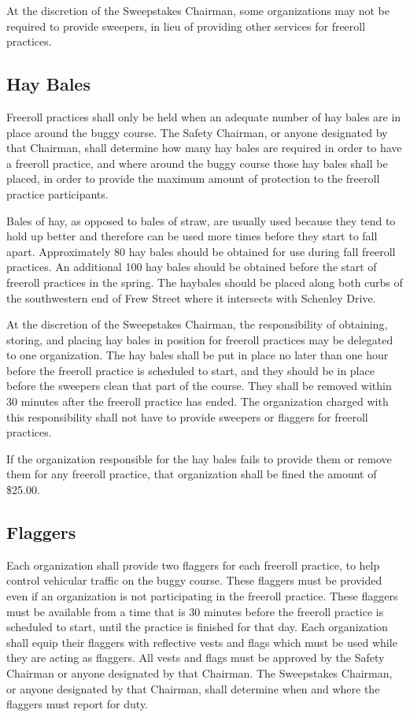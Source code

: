 At the discretion of the Sweepstakes Chairman, some organizations may not be required to provide sweepers, in lieu of providing other services for freeroll practices.

\subsection{Hay Bales}

Freeroll practices shall only be held when an adequate number of hay bales are in place around the buggy course. The Safety Chairman, or anyone designated by that Chairman, shall determine how many hay bales are required in order to have a freeroll practice, and where around the buggy course those hay bales shall be placed, in order to provide the maximum amount of protection to the freeroll practice participants.

Bales of hay, as opposed to bales of straw, are usually used because they tend to hold up better and therefore can be used more times before they start to fall apart. Approximately 80 hay bales should be obtained for use during fall freeroll practices. An additional 100 hay bales should be obtained before the start of freeroll practices in the spring. The haybales should be placed along both curbs of the southwestern end of Frew Street where it intersects with Schenley Drive.

At the discretion of the Sweepstakes Chairman, the responsibility of obtaining, storing, and placing hay bales in position for freeroll practices may be delegated to one organization. The hay bales shall be put in place no later than one hour before the freeroll practice is scheduled to start, and they should be in place before the sweepers clean that part of the course. They shall be removed within 30 minutes after the freeroll practice has ended. The organization charged with this responsibility shall not have to provide sweepers or flaggers for freeroll practices.

If the organization responsible for the hay bales fails to provide them or remove them for any freeroll practice, that organization shall be fined the amount of \$25.00.

\subsection{Flaggers}

Each organization shall provide two flaggers for each freeroll practice, to help control vehicular traffic on the buggy course. These flaggers must be provided even if an organization is not participating in the freeroll practice. These flaggers must be available from a time that is 30 minutes before the freeroll practice is scheduled to start, until the practice is finished for that day. Each organization shall equip their flaggers with reflective vests and flags which must be used while they are acting as flaggers. All vests and flags must be approved by the Safety Chairman or anyone designated by that Chairman. The Sweepstakes Chairman, or anyone designated by that Chairman, shall determine when and where the flaggers must report for duty.

